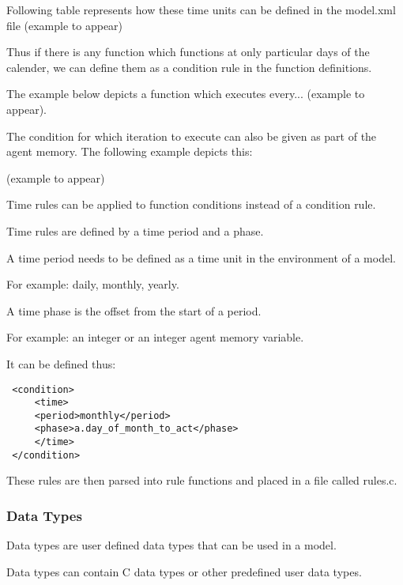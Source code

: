 Following table represents how these time units can be defined in the model.xml file
(example to appear)

Thus if there is any function which functions at only particular days of the calender, we can define them as a condition rule in the function definitions.

The example below depicts a function which executes every... (example to appear).

The condition for which iteration to execute can also be given as part of the agent memory.
The following example depicts this:

(example to appear)

Time rules can be applied to function conditions instead of a condition rule.

Time rules are defined by a time period and a phase.

A time period needs to be defined as a time unit in the environment of a model.

For example: daily, monthly, yearly.

A time phase is the offset from the start of a period.

For example: an integer or an integer agent memory variable.

It can be defined thus:

\begin{mylisting}
\begin{verbatim}
 <condition>
     <time>
     <period>monthly</period>
     <phase>a.day_of_month_to_act</phase>
     </time>
 </condition>
\end{verbatim}
\end{mylisting}

These rules are then parsed into rule functions and placed in a file called rules.c.

\subsubsection{Data Types}

Data types are user defined data types that can be used in a model.

Data types can contain C data types or other predefined user data types.

